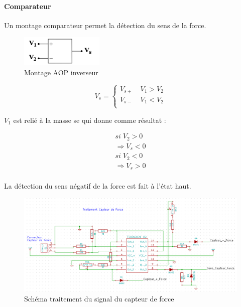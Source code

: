 \documentclass[11pt]{article}
\begin{document}
\paragraph{Comparateur}

Un montage comparateur permet la détection du sens de la force. 

\begin{figure}[!h]
	\centering
	\includegraphics[width=150px]{AOP_comp.png}
	\caption{Montage AOP inverseur}
\end{figure}
\FloatBarrier

\begin{equation}
	V_{s} = 
	\left\{
	  \begin{array}{rcr}
	    V_{s+}& \; V_{1}>V_{2} \\
	    V_{s-}& \; V_{1}<V_{2} \\
	  \end{array}
	\right.
\end{equation}

$V_{1}$ est relié à la masse se qui donne comme résultat :

\begin{equation}
 	\begin{split}
		si \; V_{2} > 0 \\
		\Rightarrow V_{s} < 0 \\			
		si \; V_{2} < 0 \\
		\Rightarrow V_{s} > 0 \\			
	\end{split}
\end{equation}

La détection du sens négatif de la force est fait à l'état haut.

\begin{figure}[!h]
    \centering
    \includegraphics[width=500px]{schema_force.png}
    \caption{Schéma traitement du signal du capteur de force}
\end{figure}
\end{document}
